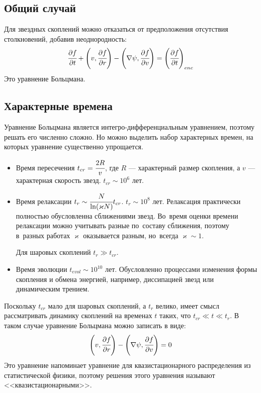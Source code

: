 \documentclass{beamer}
\begin{document}
\subsection{Общий случай}
\begin{frame}
    Для звездных скоплений можно отказаться от предположения отсутствия столкновений, добавив неоднородность:
    \begin{equation*}
        \cfrac{\partial f}{\partial t} + \left(v,\cfrac{\partial f}{\partial r}\right) - \left( \nabla \psi,\cfrac{\partial f}{\partial v}\right)  = \left(\cfrac{\partial f}{\partial t}\right)_{enc}
    \end{equation*}
    Это уравнение Больцмана.
\end{frame}
\subsection{Характерные времена}
\begin{frame}
Уравнение Больцмана является интегро-дифференциальным уравнением, поэтому решать его численно сложно. 
Но можно выделить набор характерных времен, на которых уравнение существенно упрощается.
\begin{itemize}
    \item Время пересечения $t_{cr} = \cfrac{2R}{v}$, где $R$ --- характерный размер скопления, а $v$ --- характерная скорость звезд. $t_{cr} \sim 10^6$ лет.
    \item Время релаксации $t_r \sim \cfrac{N}{\ln(\varkappa N)} t_{cr}$. $t_r \sim 10^8$ лет. Релаксация практически полностью обусловленна сближениями звезд.
    Во~время оценки времени релаксации можно учитывать разные по~составу сближения, поэтому в~разных работах $\varkappa$ оказывается разным, но~всегда $\varkappa \sim 1$.
    \par
    Для шаровых скоплений $t_r \gg  t_{cr}$. 
\end{itemize}
\end{frame}
\begin{frame}
    \begin{itemize}
        \item Время эволюции $t_{evol} \sim 10^{10}$ лет. Обусловленно процессами изменения формы скопления и обмена энергией, 
        например, диссипацией звезд или динамическим трением. 
    \end{itemize}
    Поскольку $t_{cr}$ мало для шаровых скоплений, а $t_{r}$ велико, имеет смысл рассматривать динамику скоплений на временах $t$ таких, что
    $t_{cr} \ll t \ll t_{r}$. В таком случае уравнение Больцмана можно записать в виде:
    \begin{equation*}
        \left(v,\cfrac{\partial f}{\partial r}\right) - \left( \nabla \psi,\cfrac{\partial f}{\partial v}\right) = 0
    \end{equation*}
    Это уравнение напоминает уравнение для квазистационарного распределения из статистической физики, поэтому решения этого уравнения называют <<квазистационарными>>.
\end{frame}
\end{document}
